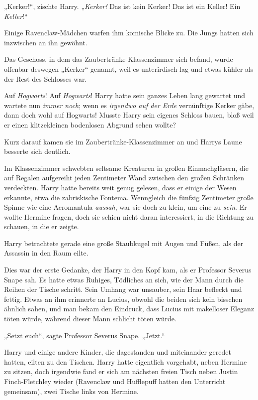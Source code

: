 {„Kerker!“, zischte Harry. „\emph{Kerker!} Das ist kein Kerker! Das ist ein Keller! Ein \emph{Keller}!“

Einige Ravenclaw-Mädchen warfen ihm komische Blicke zu. Die Jungs hatten sich inzwischen an ihn gewöhnt.

Das Geschoss, in dem das Zaubertränke-Klassenzimmer sich befand, wurde offenbar deswegen „Kerker“ genannt, weil es unterirdisch lag und etwas kühler als der Rest des Schlosses war.

Auf \emph{Hogwarts}! Auf \emph{Hogwarts}! Harry hatte sein ganzes Leben lang gewartet und wartete nun \emph{immer noch}; wenn es \emph{irgendwo auf der Erde} vernünftige Kerker gäbe, dann doch wohl auf Hogwarts! Musste Harry sein eigenes Schloss bauen, bloß weil er einen klitzekleinen bodenlosen Abgrund sehen wollte?

Kurz darauf kamen sie im Zaubertränke-Klassenzimmer an und Harrys Laune besserte sich deutlich.

Im Klassenzimmer schwebten seltsame Kreaturen in großen Einmachgläsern, die auf Regalen aufgereiht jeden Zentimeter Wand zwischen den großen Schränken verdeckten. Harry hatte bereits weit genug gelesen, dass er einige der Wesen erkannte, etwa die zabriskische Fontema. Wenngleich die fünfzig Zentimeter große Spinne wie eine Acromantula \emph{aussah}, war sie doch zu klein, um eine zu \emph{sein}. Er wollte Hermine fragen, doch sie schien nicht daran interessiert, in die Richtung zu schauen, in die er zeigte.

Harry betrachtete gerade eine große Staubkugel mit Augen und Füßen, als der Assassin in den Raum eilte.

Dies war der erste Gedanke, der Harry in den Kopf kam, als er Professor Severus Snape sah. Es hatte etwas Ruhiges, Tödliches an sich, wie der Mann durch die Reihen der Tische schritt. Sein Umhang war unsauber, sein Haar befleckt und fettig. Etwas an ihm erinnerte an Lucius, obwohl die beiden sich kein bisschen ähnlich sahen, und man bekam den Eindruck, dass Lucius mit makelloser Eleganz töten würde, während dieser Mann schlicht töten würde.

„Setzt euch“, sagte Professor Severus Snape. „Jetzt.“

Harry und einige andere Kinder, die dagestanden und miteinander geredet hatten, eilten zu den Tischen. Harry hatte eigentlich vorgehabt, neben Hermine zu sitzen, doch irgendwie fand er sich am nächsten freien Tisch neben Justin Finch-Fletchley wieder (Ravenclaw und Hufflepuff hatten den Unterricht gemeinsam), zwei Tische links von Hermine.

}
